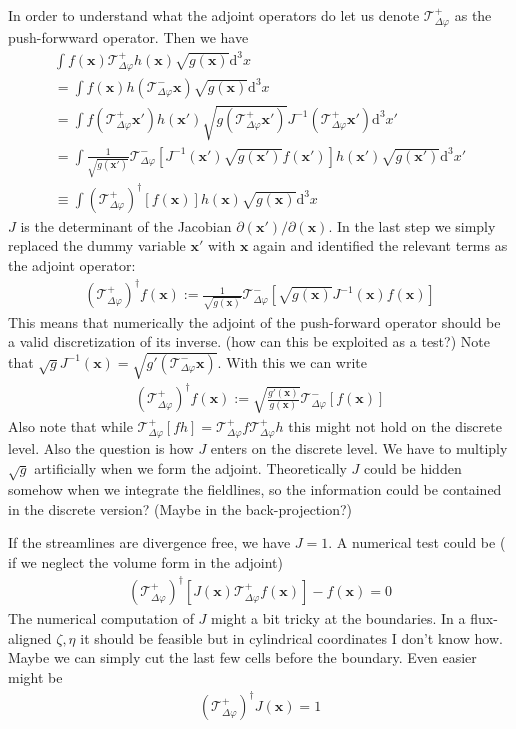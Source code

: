 \documentclass{hitec} %
\renewcommand{\d}{\mathrm{d}}
\renewcommand{\vec}[1]{{\mathbf{#1}}}
\newcommand{\Tp}{\mathcal T^+_{\Delta\varphi}}
\newcommand{\Tm}{\mathcal T^-_{\Delta\varphi}}
\begin{document}
In order to understand what the adjoint operators do let us denote $\mathcal T^+_{\Delta\varphi}$ as the push-forwward operator. Then we have
\begin{align}
    \int f(\vec x) \Tp h(\vec x) \sqrt{g(\vec x)}\d^3x \\
    =  \int f(\vec x) h(\Tm \vec x)\sqrt{g(\vec x)}\d^3x \\
    =  \int f(\Tp \vec x') h(\vec x')\sqrt{g(\Tp \vec x')}J^{-1}( \Tp\vec x') \d^3x' \\
    =  \int \frac{1}{\sqrt{g(\vec x')}}\Tm\left[J^{-1}(\vec x')\sqrt{g(\vec x')}f(\vec x')\right] h(\vec x')\sqrt{g(\vec x')}   \d^3x' \\
    \equiv  \int (\Tp)^\dagger\left[f(\vec x)\right] h(\vec x)\sqrt{g(\vec x)}   \d^3x
    \label{}
\end{align}
$J$ is the determinant of the Jacobian $\partial(\vec x')/\partial(\vec x)$.
In the last step we simply replaced the dummy variable $\vec x'$ with $\vec x$ again and identified the relevant terms
as the adjoint operator:
\begin{align}
    (\Tp)^\dagger f(\vec x ) := \frac{1}{\sqrt{g(\vec x)}} \Tm\left[\sqrt{g(\vec x)} J^{-1}(\vec x) f(\vec x) \right]
    \label{}
\end{align}
This means that numerically the adjoint of the push-forward 
operator should be a valid discretization of its inverse. (how can this be exploited as a test?)
Note that $\sqrt{g}J^{-1}(\vec x) = \sqrt{g'(\Tm \vec x)}$.
With this we can write
\begin{align}
    (\Tp)^\dagger f(\vec x ) := \sqrt{\frac{g'(\vec x)}{g(\vec x)}} \Tm\left[f(\vec x) \right]
    \label{}
\end{align}
Also note that while $\Tp [fh] = \Tp f \Tp h$ this might not 
hold on the discrete level. Also the question is how $J$ enters 
on the discrete level. We have to multiply $\sqrt{g}$ artificially when we form the adjoint. 
Theoretically $J$ could be hidden somehow when we integrate the fieldlines, so the information could be contained in the discrete version? (Maybe in the back-projection?)

If the streamlines are divergence free, we have $J=1$.
A numerical test could be ( if we neglect the volume form in the adjoint)
\begin{align}
    (\Tp)^\dagger \left[J(\vec x)\Tp f(\vec x)\right] - f(\vec x) = 0
    \label{}
\end{align}
The numerical computation of $J$ might a bit tricky at the boundaries. 
In a flux-aligned $\zeta, \eta$ it should be feasible but in cylindrical coordinates I don't know how. Maybe we can simply cut the last few cells before the boundary.
Even easier might be
\begin{align}
    \left(\Tp\right)^\dagger J(\vec x ) = 1
    \label{}
\end{align}
\end{document}
